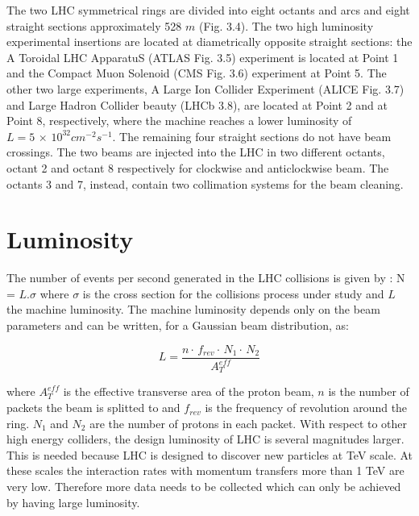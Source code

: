 The two LHC symmetrical rings are divided into eight octants and arcs and
eight straight sections approximately 528 $m$ (Fig. 3.4). The two high luminosity
experimental insertions are located at diametrically opposite straight
sections: the A Toroidal LHC ApparatuS (ATLAS Fig. 3.5) experiment is located
at Point 1 and the Compact Muon Solenoid (CMS Fig. 3.6) experiment
at Point 5. The other two large experiments, A Large Ion Collider Experiment
(ALICE Fig. 3.7) and Large Hadron Collider beauty (LHCb 3.8), are located
at Point 2 and at Point 8, respectively, where the machine reaches a lower
luminosity of $L = 5 \, \times \,10^{32} cm^{-2}s^{-1}$. The remaining four straight sections do
not have beam crossings. The two beams are injected into the LHC in two
different octants, octant 2 and octant 8 respectively for clockwise and anticlockwise
beam. The octants 3 and 7, instead, contain two collimation systems
for the beam cleaning. 

\section{Luminosity}
The number of events per second generated in the LHC collisions is given by :
N = $L.\sigma$
where $\sigma$ is the cross section for the collisions process under study and $L$ the
machine luminosity. The machine luminosity depends only on the beam parameters and can be written, 
for a Gaussian beam distribution, as:



\begin{equation}
\label{eq:Lumi}
L = \frac{n \cdot \,f_{rev}\cdot \,N_{1} \cdot \, N_{2}}{A^{eff}_T}
\end{equation}

where $A^{eff}_T$ is the effective transverse area of the proton beam, $n$ is the number of packets
the beam is splitted to and $f_{rev}$ is the frequency of revolution around the ring. $N_{1}$ and $N_{2}$ are
the number of protons in each packet. With respect to other high energy colliders, the design
luminosity of LHC is several magnitudes larger. This is needed because LHC is designed
to discover new particles at TeV scale. At these scales the interaction rates with momentum
transfers more than 1 TeV are very low. Therefore more data needs to be collected which can
only be achieved by having large luminosity.

